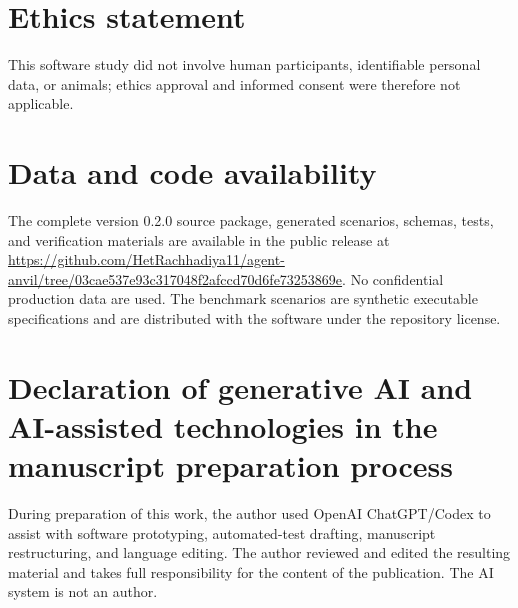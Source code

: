 \documentclass[preprint,12pt]{elsarticle}
\newcommand{\releaseurl}{https://github.com/HetRachhadiya11/agent-anvil/tree/03cae537e93c317048f2afccd70d6fe73253869e}
\begin{document}
\section*{Ethics statement}

This software study did not involve human participants, identifiable personal data, or animals; ethics approval and informed consent were therefore not applicable.

\section*{Data and code availability}

The complete version 0.2.0 source package, generated scenarios, schemas, tests, and verification materials are available in the public release at \url{\releaseurl}. No confidential production data are used. The benchmark scenarios are synthetic executable specifications and are distributed with the software under the repository license.

\section*{Declaration of generative AI and AI-assisted technologies in the manuscript preparation process}

During preparation of this work, the author used OpenAI ChatGPT/Codex to assist with software prototyping, automated-test drafting, manuscript restructuring, and language editing. The author reviewed and edited the resulting material and takes full responsibility for the content of the publication. The AI system is not an author.
\end{document}
